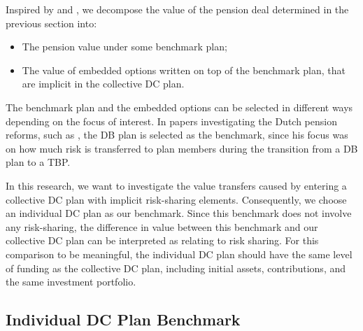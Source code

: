 \documentclass{sfuthesis}
\numberwithin{equation}{chapter}
\begin{document}
		\justify
		Inspired by \citet{Kocken2006} and \citet{soer2012}, we decompose the value of the pension deal determined in the previous section into:
		\begin{itemize}
			\item The pension value under some benchmark plan;
			\item The value of embedded options written on top of the benchmark plan, that are implicit in the collective DC plan.
		\end{itemize}
	
		\justify
		The benchmark plan and the embedded options can be selected in different ways depending on the focus of interest. In papers investigating the Dutch pension reforms, such as \citet{Kocken2006}, the DB plan is selected as the benchmark, since his focus was on how much risk is transferred to plan members during the transition from a DB plan to a TBP. 
	
	
		\justify
		In this research, we want to investigate the value transfers caused by entering a collective DC plan with implicit risk-sharing elements. Consequently, we choose an individual DC plan as our benchmark. Since this benchmark does not involve any risk-sharing, the difference in value between this benchmark and our collective DC plan can be interpreted as relating to risk sharing. For this comparison to be meaningful, the individual DC plan should have the same level of funding as the collective DC plan, including initial assets, contributions, and the same investment portfolio. 
	
	
	\subsection{Individual DC Plan Benchmark}
	\label{Individual Defined Contribution Plan}
	
\end{document}
